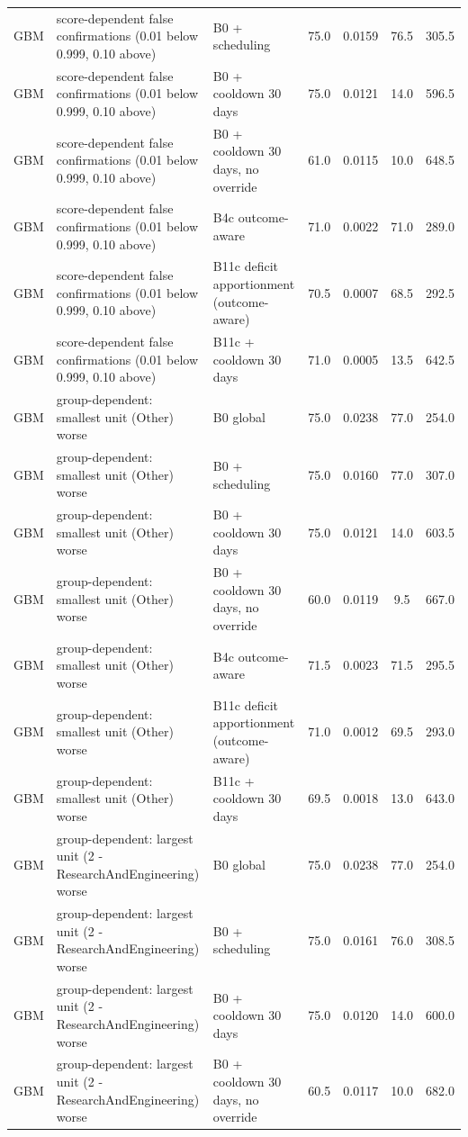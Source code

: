 \begin{longtable}{lp{5.2cm}p{4.4cm}cccc}
GBM & score-dependent false confirmations (0.01 below 0.999, 0.10 above) & B0 + scheduling & 75.0 & 0.0159 & 76.5 & 305.5 \\
GBM & score-dependent false confirmations (0.01 below 0.999, 0.10 above) & B0 + cooldown 30 days & 75.0 & 0.0121 & 14.0 & 596.5 \\
GBM & score-dependent false confirmations (0.01 below 0.999, 0.10 above) & B0 + cooldown 30 days, no override & 61.0 & 0.0115 & 10.0 & 648.5 \\
GBM & score-dependent false confirmations (0.01 below 0.999, 0.10 above) & B4c outcome-aware & 71.0 & 0.0022 & 71.0 & 289.0 \\
GBM & score-dependent false confirmations (0.01 below 0.999, 0.10 above) & B11c deficit apportionment (outcome-aware) & 70.5 & 0.0007 & 68.5 & 292.5 \\
GBM & score-dependent false confirmations (0.01 below 0.999, 0.10 above) & B11c + cooldown 30 days & 71.0 & 0.0005 & 13.5 & 642.5 \\
GBM & group-dependent: smallest unit (Other) worse & B0 global & 75.0 & 0.0238 & 77.0 & 254.0 \\
GBM & group-dependent: smallest unit (Other) worse & B0 + scheduling & 75.0 & 0.0160 & 77.0 & 307.0 \\
GBM & group-dependent: smallest unit (Other) worse & B0 + cooldown 30 days & 75.0 & 0.0121 & 14.0 & 603.5 \\
GBM & group-dependent: smallest unit (Other) worse & B0 + cooldown 30 days, no override & 60.0 & 0.0119 & 9.5 & 667.0 \\
GBM & group-dependent: smallest unit (Other) worse & B4c outcome-aware & 71.5 & 0.0023 & 71.5 & 295.5 \\
GBM & group-dependent: smallest unit (Other) worse & B11c deficit apportionment (outcome-aware) & 71.0 & 0.0012 & 69.5 & 293.0 \\
GBM & group-dependent: smallest unit (Other) worse & B11c + cooldown 30 days & 69.5 & 0.0018 & 13.0 & 643.0 \\
GBM & group-dependent: largest unit (2 - ResearchAndEngineering) worse & B0 global & 75.0 & 0.0238 & 77.0 & 254.0 \\
GBM & group-dependent: largest unit (2 - ResearchAndEngineering) worse & B0 + scheduling & 75.0 & 0.0161 & 76.0 & 308.5 \\
GBM & group-dependent: largest unit (2 - ResearchAndEngineering) worse & B0 + cooldown 30 days & 75.0 & 0.0120 & 14.0 & 600.0 \\
GBM & group-dependent: largest unit (2 - ResearchAndEngineering) worse & B0 + cooldown 30 days, no override & 60.5 & 0.0117 & 10.0 & 682.0 \\

\end{longtable}
